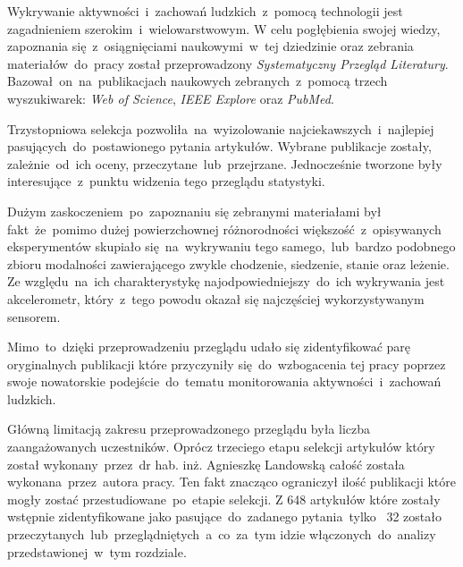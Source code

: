 Wykrywanie aktywności~i~zachowań ludzkich~z~pomocą technologii jest zagadnieniem szerokim~i~wielowarstwowym. W celu pogłębienia swojej wiedzy, zapoznania się~z~osiągnięciami naukowymi~w~tej dziedzinie oraz zebrania materiałów~do~pracy został przeprowadzony \textit{Systematyczny Przegląd Literatury}. Bazował~on~na~publikacjach naukowych zebranych~z~pomocą trzech wyszukiwarek: \textit{Web of Science}, \textit{IEEE Explore} oraz \textit{PubMed}. 

Trzystopniowa selekcja pozwoliła~na~wyizolowanie najciekawszych~i~najlepiej pasujących~do~postawionego pytania artykułów. Wybrane publikacje zostały, zależnie~od~ich oceny, przeczytane~lub~przejrzane. Jednocześnie tworzone były interesujące~z~punktu widzenia tego przeglądu statystyki. 

Dużym zaskoczeniem~po~zapoznaniu się zebranymi materiałami był fakt~że~pomimo dużej powierzchownej  różnorodności większość~z~opisywanych eksperymentów skupiało się~na~wykrywaniu tego samego,~lub~bardzo podobnego zbioru modalności zawierającego zwykle chodzenie, siedzenie, stanie oraz leżenie. Ze względu~na~ich charakterystykę najodpowiedniejszy~do~ich wykrywania jest akcelerometr, który~z~tego powodu okazał się najczęściej wykorzystywanym sensorem.

Mimo~to~dzięki przeprowadzeniu przeglądu udało się zidentyfikować parę oryginalnych publikacji które przyczyniły się~do~wzbogacenia tej pracy poprzez swoje nowatorskie podejście~do~tematu monitorowania aktywności~i~zachowań ludzkich.

Główną limitacją zakresu przeprowadzonego przeglądu była liczba zaangażowanych uczestników. Oprócz trzeciego etapu selekcji artykułów który został wykonany~przez~dr hab. inż. Agnieszkę Landowską całość została wykonana~przez~autora pracy. Ten fakt znacząco ograniczył ilość publikacji które mogły zostać przestudiowane~po~etapie selekcji. Z 648 artykułów które zostały wstępnie zidentyfikowane jako pasujące~do~zadanego pytania~tylko~ 32 zostało przeczytanych~lub~przeglądniętych~a~co~za~tym idzie włączonych~do~analizy przedstawionej~w~tym rozdziale.
